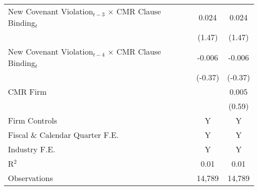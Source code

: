 {\begin{tabular}{l*{2}{c}}
New Covenant Violation$ _{t-3}$  $ \times $ CMR Clause Binding$ _t $&    0.024         &    0.024         \\
                &   (1.47)         &   (1.47)         \\
New Covenant Violation$ _{t-4}$  $ \times $ CMR Clause Binding$ _t $&   -0.006         &   -0.006         \\
                &  (-0.37)         &  (-0.37)         \\
CMR Firm        &                  &    0.005         \\
                &                  &   (0.59)         \\
\midrule Firm Controls   &        Y         &        Y         \\
Fiscal \& Calendar Quarter F.E. &        Y         &        Y         \\
Industry F.E.   &        Y         &        Y         \\

R$ ^2$          &     0.01         &     0.01         \\
Observations    &   14,789         &   14,789         \\
\bottomrule
\end{tabular}
}
